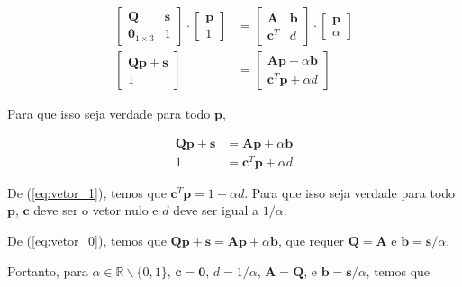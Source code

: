 \documentclass[a4paper]{article}
\begin{document}
\begin{align}
    \begin{bmatrix}
        \mathbf{Q} & \mathbf{s} \\
        \mathbf{0}_{1\times 3} & 1
    \end{bmatrix}\cdot\begin{bmatrix}\mathbf{p} \\ 1\end{bmatrix} &=
    \begin{bmatrix}
        \mathbf{A} & \mathbf{b} \\
        \mathbf{c}^T & d
    \end{bmatrix}\cdot\begin{bmatrix}\mathbf{p} \\ \alpha\end{bmatrix} \\
    \begin{bmatrix}
        \mathbf{Q}\mathbf{p} + \mathbf{s} \\
        1
    \end{bmatrix} &=
    \begin{bmatrix}
        \mathbf{A}\mathbf{p} + \alpha\mathbf{b} \\
        \mathbf{c}^T\mathbf{p} + \alpha d
    \end{bmatrix}
\end{align}

Para que isso seja verdade para todo $\mathbf{p}$,

\begin{align}
    \mathbf{Q}\mathbf{p} + \mathbf{s} &=
    \mathbf{A}\mathbf{p} + \alpha\mathbf{b} \label{eq:vetor_0} \\
    1 &=
    \mathbf{c}^T\mathbf{p} + \alpha d \label{eq:vetor_1}
\end{align}

De (\ref{eq:vetor_1}), temos que $\mathbf{c}^T\mathbf{p} = 1 - \alpha d$. Para que isso seja verdade para todo $\mathbf{p}$, $\mathbf{c}$ deve ser o vetor nulo e $d$ deve ser igual a $1/\alpha$.

De (\ref{eq:vetor_0}), temos que $\mathbf{Q}\mathbf{p} + \mathbf{s} = \mathbf{A}\mathbf{p} + \alpha\mathbf{b}$, que requer $\mathbf{Q} = \mathbf{A}$ e $\mathbf{b} = \mathbf{s}/\alpha$.

Portanto, para $\alpha \in \mathbb{R} \backslash \{0, 1\}$, $\mathbf{c} = \mathbf{0}$, $d = 1/\alpha$, $\mathbf{A} = \mathbf{Q}$, e $\mathbf{b} = \mathbf{s}/\alpha$, temos que
\end{document}

